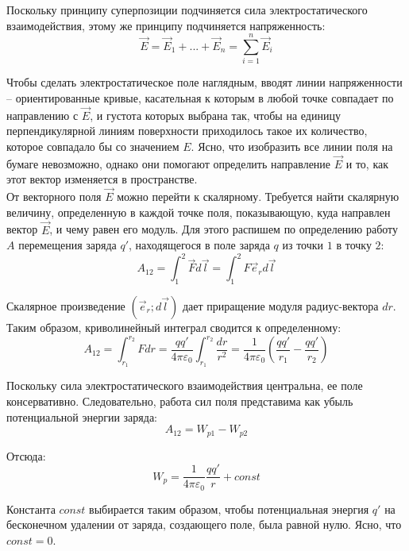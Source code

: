 \documentclass{article}
\begin{document}
	Поскольку принципу суперпозиции подчиняется сила электростатического взаимодействия, этому же принципу подчиняется напряженность:
	\begin{equation}
		\vec E = \vec E_1 + ... + \vec E_n = \sum_{i=1}^n \vec E_i
	\end{equation}

	Чтобы сделать электростатическое поле наглядным, вводят линии напряженности -- ориентированные кривые, касательная к которым в любой точке совпадает по направлению с $\vec E$, и густота которых выбрана так, чтобы на единицу перпендикулярной линиям поверхности приходилось такое их количество, которое совпадало бы со значением $E$. Ясно, что изобразить все линии поля на бумаге невозможно, однако они помогают определить направление $\vec E$ и то, как этот вектор изменяется в пространстве.\\

	От векторного поля $\vec E$ можно перейти к скалярному. Требуется найти скалярную величину, определенную в каждой точке поля, показывающую, куда направлен вектор $\vec E$, и чему равен его модуль. Для этого распишем по определению работу $A$ перемещения заряда $q'$, находящегося в поле заряда $q$ из точки $1$ в точку $2$:
	\begin{equation}
		A_{12} = \int_1^2 \vec Fd\vec l = \int_1^2 F\vec e_r d\vec l
	\end{equation}

	Скалярное произведение $(\vec e_r; d\vec l)$ дает приращение модуля радиус-вектора $dr$. Таким образом, криволинейный интеграл сводится к определенному:
	\begin{equation}
		A_{12} = \int_{r_1}^{r_2} Fdr = \frac{qq'}{4\pi\varepsilon_0}\int_{r_1}^{r_2}\frac{dr}{r^2} = \frac{1}{4\pi\varepsilon_0}(\frac{qq'}{r_1}-\frac{qq'}{r_2})
	\end{equation}

	Поскольку сила электростатического взаимодействия центральна, ее поле консервативно. Следовательно, работа сил поля представима как убыль потенциальной энергии заряда:
	\begin{equation}
		A_{12} = W_{p1} - W_{p2}
	\end{equation}

	Отсюда:
	\begin{equation}
		W_{p} = \frac{1}{4\pi\varepsilon_0}\frac{qq'}{r} + const
	\end{equation}

	Константа $const$ выбирается таким образом, чтобы потенциальная энергия $q'$ на бесконечном удалении от заряда, создающего поле, была равной нулю. Ясно, что $const=0$.\\
\end{document}
